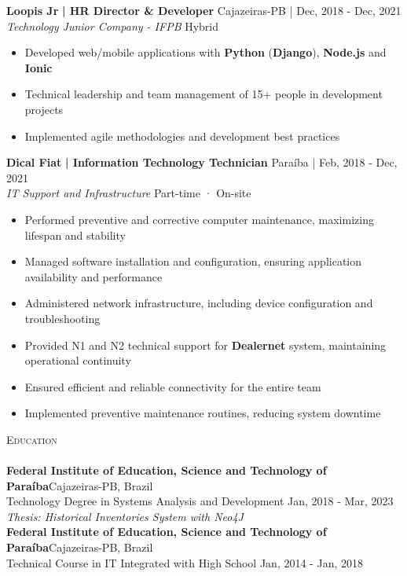 \documentclass[a4paper]{article}
\newcommand{\lineunder}{
    \vspace*{-8pt} \\
    \hspace*{-18pt} \hrulefill \\
}
\newcommand{\header}[1]{
    {\hspace*{-18pt}\vspace*{6pt} \textsc{#1}}
    \vspace*{-6pt} \lineunder
}
\begin{document}
\textbf{Loopis Jr}\textbf{ | HR Director \& Developer} \hfill Cajazeiras-PB | Dec, 2018 - Dec, 2021\\
\textit{Technology Junior Company - IFPB} \hfill Hybrid\\
\vspace{-3mm}
\begin{itemize} \itemsep -3pt
    \item Developed web/mobile applications with \textbf{Python} (\textbf{Django}), \textbf{Node.js} and \textbf{Ionic}
    \item Technical leadership and team management of 15+ people in development projects
    \item Implemented agile methodologies and development best practices
\end{itemize}

\textbf{Dical Fiat}\textbf{ | Information Technology Technician} \hfill Paraíba | Feb, 2018 - Dec, 2021\\
\textit{IT Support and Infrastructure} \hfill Part-time · On-site\\
\vspace{-3mm}
\begin{itemize} \itemsep -3pt
    \item Performed preventive and corrective computer maintenance, maximizing lifespan and stability
    \item Managed software installation and configuration, ensuring application availability and performance
    \item Administered network infrastructure, including device configuration and troubleshooting
    \item Provided N1 and N2 technical support for \textbf{Dealernet} system, maintaining operational continuity
    \item Ensured efficient and reliable connectivity for the entire team
    \item Implemented preventive maintenance routines, reducing system downtime
\end{itemize}

%
%
\header{Education}
\vspace{2mm}
\textbf{Federal Institute of Education, Science and Technology of Paraíba}\hfill Cajazeiras-PB, Brazil\\
Technology Degree in Systems Analysis and Development \hfill Jan, 2018 - Mar, 2023\\
{\sl Thesis: Historical Inventories System with Neo4J }\\
\vspace{2mm}
\textbf{Federal Institute of Education, Science and Technology of Paraíba}\hfill Cajazeiras-PB, Brazil\\
Technical Course in IT Integrated with High School \hfill Jan, 2014 - Jan, 2018\\
\vspace{2mm}
\end{document}
